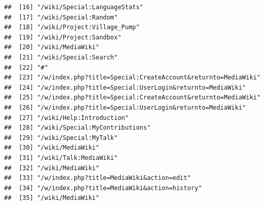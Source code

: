 \documentclass[
]{article}
\begin{document}
\begin{verbatim}
##  [16] "/wiki/Special:LanguageStats"                                                                                                 
##  [17] "/wiki/Special:Random"                                                                                                        
##  [18] "/wiki/Project:Village_Pump"                                                                                                  
##  [19] "/wiki/Project:Sandbox"                                                                                                       
##  [20] "/wiki/MediaWiki"                                                                                                             
##  [21] "/wiki/Special:Search"                                                                                                        
##  [22] "#"                                                                                                                           
##  [23] "/w/index.php?title=Special:CreateAccount&returnto=MediaWiki"                                                                 
##  [24] "/w/index.php?title=Special:UserLogin&returnto=MediaWiki"                                                                     
##  [25] "/w/index.php?title=Special:CreateAccount&returnto=MediaWiki"                                                                 
##  [26] "/w/index.php?title=Special:UserLogin&returnto=MediaWiki"                                                                     
##  [27] "/wiki/Help:Introduction"                                                                                                     
##  [28] "/wiki/Special:MyContributions"                                                                                               
##  [29] "/wiki/Special:MyTalk"                                                                                                        
##  [30] "/wiki/MediaWiki"                                                                                                             
##  [31] "/wiki/Talk:MediaWiki"                                                                                                        
##  [32] "/wiki/MediaWiki"                                                                                                             
##  [33] "/w/index.php?title=MediaWiki&action=edit"                                                                                    
##  [34] "/w/index.php?title=MediaWiki&action=history"                                                                                 
##  [35] "/wiki/MediaWiki"                                                                                                             

\end{verbatim}
\end{document}
